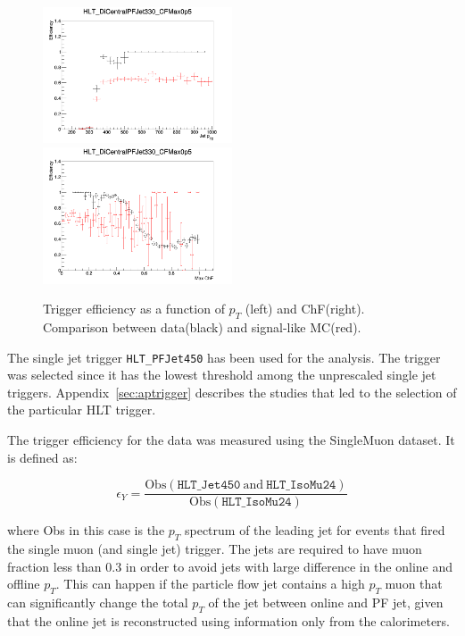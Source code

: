 \begin{figure}[h]
  \centering
  \includegraphics[width=0.5\textwidth]{figures/trigger/pt_eff_05_DataSIMP.png}\hfill%
  \includegraphics[width=0.5\textwidth]{figures/trigger/chf_eff_05_DataSIMP.png}
  \caption{Trigger efficiency as a function of $p_{T}$ (left) and ChF(right). Comparison between data(black) and signal-like MC(red).}
  \label{fig:efficiencies_simp_data}
\end{figure}

The single jet trigger \texttt{HLT\_PFJet450} has been used for the analysis. The trigger was selected since it has the lowest threshold among the unprescaled single jet triggers. Appendix~\ref{sec:aptrigger} describes the studies that led to the selection of the particular HLT trigger. 

The trigger efficiency for the data was measured using the SingleMuon dataset. It is defined as:

\begin{equation}
\epsilon_{Y} = \frac{\mathrm{Obs}(\texttt{HLT\_Jet450}\ \mathrm{and}\ \texttt{HLT\_IsoMu24})}{\mathrm{Obs}(\texttt{HLT\_IsoMu24})}
\end{equation} 

where Obs in this case is the $p_T$ spectrum of the leading jet for events that fired the single muon (and single jet) trigger. The jets are required to have muon fraction less than $0.3$ in order to avoid jets with large difference in the online and offline $p_T$. This can happen if the particle flow jet contains a high $p_T$ muon that can significantly change the total $p_T$ of the jet between online and PF jet, given that the online jet is reconstructed using information only from the calorimeters.

